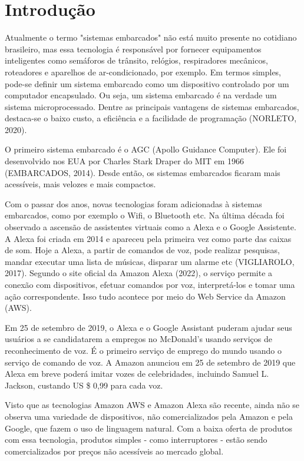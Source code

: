 \chapter{Introdução}
Atualmente o termo "sistemas embarcados" não está muito presente no cotidiano brasileiro, mas essa tecnologia é responsável por fornecer equipamentos inteligentes como semáforos de trânsito, relógios, respiradores mecânicos, roteadores e aparelhos de ar-condicionado, por exemplo. Em termos simples, pode-se definir um sistema embarcado como um dispositivo controlado por um computador encapsulado. Ou seja, um sistema embarcado é na verdade um sistema microprocessado. Dentre as principais vantagens de sistemas embarcados, destaca-se o baixo custo, a eficiência e a facilidade de programação (NORLETO, 2020).

O primeiro sistema embarcado é o AGC (Apollo Guidance Computer). Ele foi desenvolvido nos EUA por Charles Stark Draper do MIT em 1966 (EMBARCADOS, 2014). Desde então, os sistemas embarcados ficaram mais acessíveis, mais velozes e mais compactos.

Com o passar dos anos, novas tecnologias foram adicionadas à sistemas embarcados, como por exemplo o Wifi, o Bluetooth etc. Na última década foi observado a ascensão de assistentes virtuais como a Alexa e o Google Assistente. A Alexa foi criada em 2014 e apareceu pela primeira vez como parte das caixas de som. Hoje a Alexa, a partir de comandos de voz, pode realizar pesquisas, mandar executar uma lista de músicas, disparar um alarme etc (VIGLIAROLO, 2017). Segundo o site oficial da Amazon Alexa (2022), o serviço permite a conexão com dispositivos, efetuar comandos por voz, interpretá-los e tomar uma ação correspondente. Isso tudo acontece por meio do Web Service da Amazon (AWS).

Em 25 de setembro de 2019, o Alexa e o Google Assistant puderam ajudar seus usuários a se candidatarem a empregos no McDonald's usando serviços de reconhecimento de voz. É o primeiro serviço de emprego do mundo usando o serviço de comando de voz. A Amazon anunciou em 25 de setembro de 2019 que Alexa em breve poderá imitar vozes de celebridades, incluindo Samuel L. Jackson, custando US \$ 0,99 para cada voz.

Visto que as tecnologias Amazon AWS e Amazon Alexa são recente, ainda não se observa uma variedade de dispositivos, não comercializados pela Amazon e pela Google, que fazem o uso de linguagem natural. Com a baixa oferta de produtos com essa tecnologia, produtos simples - como interruptores - estão sendo comercializados por preços não acessíveis ao mercado global.

